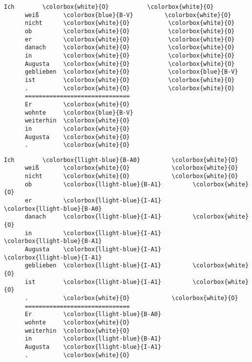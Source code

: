 \begin{srl}[!h]
\centering
  \begin{minipage}{0.45\linewidth}
  \vspace{0pt}
    \begin{BVerbatim}[commandchars=\\\{\}, fontsize=\footnotesize]
      Ich        \colorbox{white}{O}           \colorbox{white}{O}
      weiß       \colorbox{blue}{B-V}         \colorbox{white}{O}
      nicht      \colorbox{white}{O}           \colorbox{white}{O}
      ob         \colorbox{white}{O}           \colorbox{white}{O}
      er         \colorbox{white}{O}           \colorbox{white}{O}
      danach     \colorbox{white}{O}           \colorbox{white}{O}
      in         \colorbox{white}{O}           \colorbox{white}{O}
      Augusta    \colorbox{white}{O}           \colorbox{white}{O}
      geblieben  \colorbox{white}{O}           \colorbox{blue}{B-V}
      ist        \colorbox{white}{O}           \colorbox{white}{O}
      .          \colorbox{white}{O}           \colorbox{white}{O}
      ==============================
      Er         \colorbox{white}{O}
      wohnte     \colorbox{blue}{B-V}
      weiterhin  \colorbox{white}{O}
      in         \colorbox{white}{O}
      Augusta    \colorbox{white}{O}
      .          \colorbox{white}{O}
    \end{BVerbatim}
  \end{minipage}
  \hfill
  \begin{minipage}{0.45\linewidth}
  \vspace{0pt}
    \begin{BVerbatim}[commandchars=\\\{\}, fontsize=\footnotesize]
      Ich        \colorbox{llight-blue}{B-A0}         \colorbox{white}{O}
      weiß       \colorbox{white}{O}            \colorbox{white}{O}
      nicht      \colorbox{white}{O}            \colorbox{white}{O}
      ob         \colorbox{llight-blue}{B-A1}         \colorbox{white}{O}
      er         \colorbox{llight-blue}{I-A1}         \colorbox{llight-blue}{B-A0}
      danach     \colorbox{llight-blue}{I-A1}         \colorbox{white}{O}
      in         \colorbox{llight-blue}{I-A1}         \colorbox{llight-blue}{B-A1}
      Augusta    \colorbox{llight-blue}{I-A1}         \colorbox{llight-blue}{I-A1}
      geblieben  \colorbox{llight-blue}{I-A1}         \colorbox{white}{O}
      ist        \colorbox{llight-blue}{I-A1}         \colorbox{white}{O}
      .          \colorbox{white}{O}            \colorbox{white}{O}
      ==============================
      Er         \colorbox{llight-blue}{B-A0}
      wohnte     \colorbox{white}{O}
      weiterhin  \colorbox{white}{O}
      in         \colorbox{llight-blue}{B-A1}
      Augusta    \colorbox{llight-blue}{I-A1}
      .          \colorbox{white}{O}
    \end{BVerbatim}
  \end{minipage}
\end{srl}


